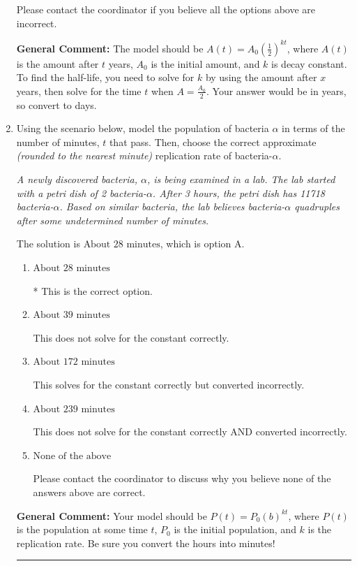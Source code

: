 \documentclass{extbook}[14pt]
\newcommand{\litem}[1]{\item #1

\rule{\textwidth}{0.4pt}}
\begin{document}
\begin{enumerate}
{\begin{enumerate}[label=\Alph*.]
Please contact the coordinator if you believe all the options above are incorrect.
\end{enumerate}

\textbf{General Comment:} The model should be $A(t) = A_0 (\frac{1}{2})^{kt}$, where $A(t)$ is the amount after $t$ years, $A_0$ is the initial amount, and $k$ is decay constant. To find the half-life, you need to solve for $k$ by using the amount after $x$ years, then solve for the time $t$ when $A = \frac{A_0}{2}$. Your answer would be in years, so convert to days.
}
\litem{
Using the scenario below, model the population of bacteria $\alpha$ in terms of the number of minutes, $t$ that pass. Then, choose the correct approximate \textit{(rounded to the nearest minute)} replication rate of bacteria-$\alpha$.

\begin{center}
    \textit{ A newly discovered bacteria, $\alpha$, is being examined in a lab. The lab started with a petri dish of 2 bacteria-$\alpha$. After 3 hours, the petri dish has 11718 bacteria-$\alpha$. Based on similar bacteria, the lab believes bacteria-$\alpha$ quadruples after some undetermined number of minutes. }
\end{center}


The solution is \( \text{About } 28 \text{ minutes} \), which is option A.\begin{enumerate}[label=\Alph*.]
\item \( \text{About } 28 \text{ minutes} \)

* This is the correct option.
\item \( \text{About } 39 \text{ minutes} \)

This does not solve for the constant correctly.
\item \( \text{About } 172 \text{ minutes} \)

This solves for the constant correctly but converted incorrectly.
\item \( \text{About } 239 \text{ minutes} \)

This does not solve for the constant correctly AND converted incorrectly.
\item \( \text{None of the above} \)

Please contact the coordinator to discuss why you believe none of the answers above are correct.
\end{enumerate}

\textbf{General Comment:} Your model should be $P(t) = P_0(b)^{kt}$, where $P(t)$ is the population at some time $t$, $P_0$ is the initial population, and $k$ is the replication rate. Be sure you convert the hours into minutes!
}
\end{enumerate}
\end{document}
